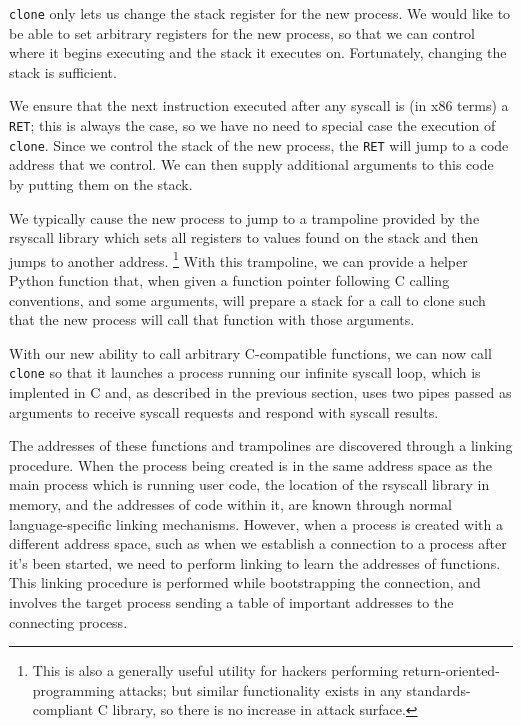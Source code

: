 \documentclass{acmart}
\begin{document}
\texttt{clone} only lets us change the stack register for the new process.
We would like to be able to set arbitrary registers for the new process,
so that we can control where it begins executing and the stack it executes on.
Fortunately, changing the stack is sufficient.

We ensure that the next instruction executed after any syscall
is (in x86 terms) a \texttt{RET};
this is always the case, so we have no need to special case the execution of \texttt{clone}.
Since we control the stack of the new process,
the \texttt{RET} will jump to a code address that we control.
We can then supply additional arguments to this code
by putting them on the stack.

We typically cause the new process to jump to a trampoline provided by the rsyscall library
which sets all registers to values found on the stack
and then jumps to another address.
\footnote{This is also a generally useful utility for hackers performing return-oriented-programming attacks;
but similar functionality exists in any standards-compliant C library,
so there is no increase in attack surface.}
With this trampoline,
we can provide a helper Python function that,
when given a function pointer following C calling conventions, and some arguments,
will prepare a stack for a call to clone such that the new process will call that function with those arguments.

With our new ability to call arbitrary C-compatible functions,
we can now call \texttt{clone} so that it launches a process running our infinite syscall loop,
which is implented in C and, as described in the previous section,
uses two pipes passed as arguments to receive syscall requests and respond with syscall results.

The addresses of these functions and trampolines are discovered through a linking procedure.
When the process being created is in the same address space as the main process which is running user code,
the location of the rsyscall library in memory, and the addresses of code within it,
are known through normal language-specific linking mechanisms.
However, when a process is created with a different address space,
such as when we establish a connection to a process after it's been started,
we need to perform linking to learn the addresses of functions.
This linking procedure is performed while bootstrapping the connection,
and involves the target process sending a table of important addresses to the connecting process.
\end{document}

